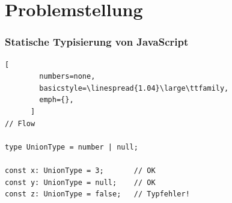 




  \section{Problemstellung}


    \begin{frame}[fragile]
      \frametitle{Statische Typisierung von JavaScript}
      \begin{lstlisting}[
        numbers=none,
        basicstyle=\linespread{1.04}\large\ttfamily,
        emph={},
      ]
// Flow

type UnionType = number | null;

const x: UnionType = 3;       // OK
const y: UnionType = null;    // OK
const z: UnionType = false;   // Typfehler!
      \end{lstlisting}
    \end{frame}


